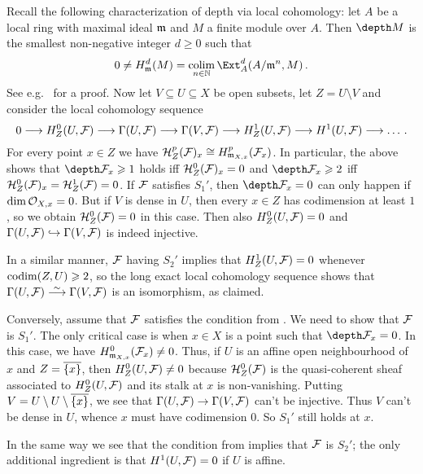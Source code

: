 \begin{proof*}
	Recall the following characterization of depth via local cohomology: let $A$ be a local ring with maximal ideal $\mathfrak{m}$ and $M$ a finite module over $A$. Then $\depth M$ is the smallest non-negative integer $d\geq 0$ such that
	\begin{equation*}
		0\neq H_\mm^d(M)=\colimit_{n\in\IN}\Ext_A^d(A/\mm^n,M)\,.
	\end{equation*}
	See e.g.\ \cite[Theorem~3.8]{LocalCohomology} for a proof. Now let $V\subseteq U\subseteq X$ be open subsets, let $Z=U\setminus V$ and consider the local cohomology sequence
	\begin{equation*}
		0\morphism H_Z^0(U,\Ff)\morphism \Global(U,\Ff)\morphism \Global(V,\Ff)\morphism H^1_Z(U,\Ff)\morphism H^1(U,\Ff)\morphism\dotso\,.
	\end{equation*}
	For every point $x\in Z$ we have $\mathcal{H}_Z^p(\mathcal{F})_x\cong H_{\mathfrak{m}_{X,x}}^p(\mathcal{F}_x)$. In particular, the above shows that $\depth \Ff_x\geq 1$ holds iff $\mathcal{H}_Z^0(\mathcal{F})_x=0$ and $\depth \Ff_x\geq 2$ iff $\mathcal{H}_Z^0(\mathcal{F})_x=\mathcal{H}_Z^1(\mathcal{F})=0$. If $\mathcal{F}$ satisfies $S_1'$, then $\depth \Ff_x=0$ can only happen if $\dim\mathcal{O}_{X,x}=0$. But if $V$ is dense in $U$, then every $x\in Z$ has codimension at least $1$, so we obtain $\mathcal{H}_Z^0(\mathcal{F})=0$ in this case. Then also $H_Z^0(U,\mathcal{F})=0$ and $\Global(U,\Ff)\monomorphism \Global(V,\Ff)$ is indeed injective.
	
	In a similar manner, $\mathcal{F}$ having $S_2'$ implies that $H_Z^1(U,\mathcal{F})=0$ whenever $\operatorname{codim} (Z,U)\geqslant 2$, so the long exact local cohomology sequence shows that $\Global(U,\Ff)\isomorphism \Global(V,\Ff)$ is an isomorphism, as claimed.
	
	Conversely, assume that $\mathcal{F}$ satisfies the condition from . We need to show that $\mathcal{F}$ is $S_1'$. The only critical case is when $x\in X$ is a point such that $\depth \Ff_x=0$. In this case, we have $H_{\mathfrak{m}_{X,x}}^0(\mathcal{F}_x)\neq 0$. Thus, if $U$ is an affine open neighbourhood of $x$ and $Z=\ov{\{x\}}$, then $H_Z^0(U,\mathcal{F})\neq 0$ because $\mathcal{H}_Z^0(\mathcal{F})$ is the quasi-coherent sheaf associated to $H_Z^0(U,\mathcal{F})$ and its stalk at $x$ is non-vanishing. Putting $V=U\setminus U\setminus \ov{\{x\}}$, we see that $\Global(U,\Ff)\morphism \Global(V,\Ff)$ can't be injective. Thus $V$ can't be dense in $U$, whence $x$ must have codimension $0$. So $S_1'$ still holds at $x$.
	
	In the same way we see that the condition from  implies that $\mathcal{F}$ is $S_2'$; the only additional ingredient is that $H^1(U,\mathcal{F})=0$ if $U$ is affine.
\end{proof*}
